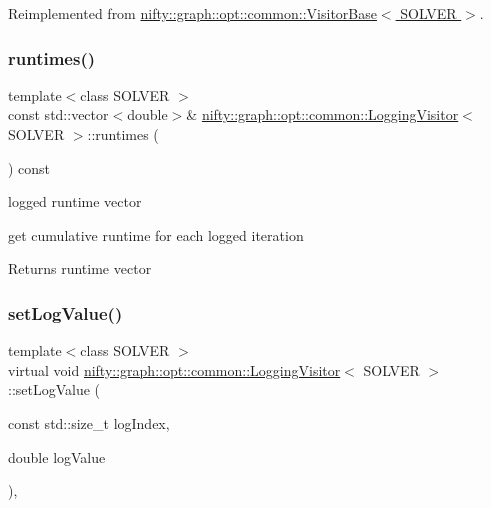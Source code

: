 Reimplemented from \hyperlink{classnifty_1_1graph_1_1opt_1_1common_1_1VisitorBase_ad9092d8387ff327b254df08ef97363a3}{nifty\+::graph\+::opt\+::common\+::\+Visitor\+Base$<$ S\+O\+L\+V\+E\+R $>$}.

\mbox{\label{classnifty_1_1graph_1_1opt_1_1common_1_1LoggingVisitor_a4cef121f38488dc23115927768c7b8b3}} 
\subsubsection{\texorpdfstring{runtimes()}{runtimes()}}
{\footnotesize\ttfamily template$<$class S\+O\+L\+V\+ER $>$ \\
const std\+::vector$<$double$>$\& \hyperlink{classnifty_1_1graph_1_1opt_1_1common_1_1LoggingVisitor}{nifty\+::graph\+::opt\+::common\+::\+Logging\+Visitor}$<$ S\+O\+L\+V\+ER $>$\+::runtimes (\begin{DoxyParamCaption}{ }\end{DoxyParamCaption}) const\hspace{0.3cm}{\ttfamily [inline]}}



logged runtime vector 

get cumulative runtime for each logged iteration \begin{DoxyReturn}{Returns}
runtime vector 
\end{DoxyReturn}
\mbox{\label{classnifty_1_1graph_1_1opt_1_1common_1_1LoggingVisitor_a2e4db3bf347a0f6eae52d2b66c341935}} 
\subsubsection{\texorpdfstring{set\+Log\+Value()}{setLogValue()}}
{\footnotesize\ttfamily template$<$class S\+O\+L\+V\+ER $>$ \\
virtual void \hyperlink{classnifty_1_1graph_1_1opt_1_1common_1_1LoggingVisitor}{nifty\+::graph\+::opt\+::common\+::\+Logging\+Visitor}$<$ S\+O\+L\+V\+ER $>$\+::set\+Log\+Value (\begin{DoxyParamCaption}\item[{const std\+::size\+\_\+t}]{log\+Index,  }\item[{double}]{log\+Value }\end{DoxyParamCaption})\hspace{0.3cm}{\ttfamily [inline]}, {\ttfamily [virtual]}}



